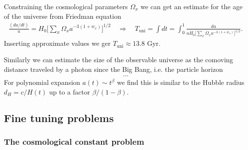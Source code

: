 \begin{mytheorem}
Constraining the cosmological parameters $\Omega_x$ we can get an estimate for the age of the universe from Friedman equation
\begin{align} 
    \frac{(da/dt)}{a} = H_0 \Big[\sum_x \Omega_x a^{-3(1+w_x)} \Big]^{1/2} \quad \Rightarrow \quad T_{\text{uni}}=\int dt = \int_0^1\frac{da}{a H_0 \Big[\sum_x \Omega_x a^{-3(1+w_x)} \Big]^{1/2}}.
\end{align}
Inserting approximate values we ger $T_{\text{uni}} \approx 13.8$ Gyr.
%
\end{mytheorem}


\begin{mytheorem}
Similarly we can estimate the size of the observable universe as the comoving distance traveled by a photon since the Big Bang, i.e. the particle horizon
\begin{align}
    \dots
\end{align}
For polynomial expansion $a(t) \sim t^\beta$ we find this is similar to the Hubble radius $d_H = c/H(t)$ up to a factor $\beta/(1-\beta)$.
    
\end{mytheorem}





\subsection{Fine tuning problems}



\subsubsection*{The cosmological constant problem}


